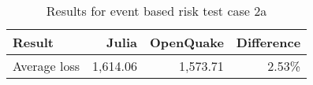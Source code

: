 \begin{table}[htbp]

\centering
\begin{tabular}{ l r r r }

\hline
\rowcolor{anti-flashwhite}
\bf{Result} & \bf{Julia} & \bf{OpenQuake} & \bf{Difference}\\
\hline
Average loss & 1,614.06 & 1,573.71 & 2.53\% \\
\hline
\end{tabular}

\caption{Results for event based risk test case 2a}
\label{tab:result-ebr-2a}
\end{table}